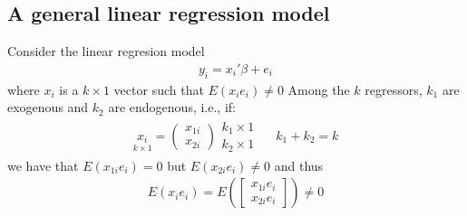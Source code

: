 \documentclass[a4paper,twoside,11pt]{article}
\begin{document}
\subsection{A general linear regression model}
Consider the linear regresion model
\begin{equation*}
\begin{aligned}
y_i = x_i' \beta + e_{i}
\end{aligned} 
\end{equation*}
where $x_i$ is a $k \times 1$ vector such that $E(x_i e_i)\ne 0$
\newline
\newline
Among the $k$ regressors, $k_1$ are exogenous and $k_2$ are endogenous, i.e., if:
\begin{equation*}
\begin{aligned}
\underset{k \times 1}{x_i} = \begin{pmatrix}
x_{1i} \\
x_{2i}
\end{pmatrix} \begin{matrix}
k_1 \times 1 \\
k_2 \times 1
\end{matrix} \ \ \ \ \ \ k_1 + k_2 = k
\end{aligned} 
\end{equation*}
we have that $E(x_{1i}e_i) =0$ but $E(x_{2i}e_i) \ne 0$ and thus
\begin{equation*}
\begin{aligned}
E(x_i e_i ) = E(\begin{bmatrix} x_{1i}e_i \\ x_{2i}e_i \end{bmatrix} ) \ne 0
\end{aligned} 
\end{equation*}
\end{document}

